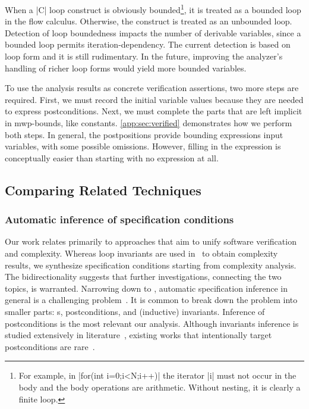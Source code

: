 When a \pr|C| loop construct is obviously bounded\footnote{For example, in \pr|for(int i=0;i<N;i++)| the iterator \pr|i| must not occur in the body and the body operations are arithmetic. Without nesting, it is clearly a finite loop.}, it is treated as a bounded loop in the flow calculus.
Otherwise, the construct is treated as an unbounded loop.
Detection of loop boundedness impacts the number of derivable variables, since a bounded loop permits iteration-dependency.
The current detection is based on loop form and it is still rudimentary.
In the future, improving the analyzer's handling of richer loop forms would yield more bounded variables.

To use the analysis results as concrete verification assertions, two more steps are required.
First, we must record the initial variable values because they are needed to express postconditions.
Next, we must complete the parts that are left implicit in mwp-bounds, like constants.
\autoref{app:sec:verified} demonstrates how we perform both steps.
In general, the postpositions provide bounding expressions \wrt input variables, with some possible omissions.
However, filling in the expression is conceptually easier than starting with no expression at all.

\subsection{Comparing Related Techniques}\label{sec:related-works}

\subsubsection{Automatic inference of specification conditions}
\label{subsec:automatic-inference}

Our work relates primarily to approaches that aim to unify software verification and complexity.
Whereas loop invariants are used in~\cite{nguyen2017} to obtain complexity results, we synthesize specification conditions starting from complexity analysis.
The bidirectionality suggests that further investigations, connecting the two topics, is warranted.
Narrowing down to , automatic specification inference in general is a challenging problem~\cite{dillig2013,yu2023}.
It is common to break down the problem into smaller parts: s, postconditions, and (inductive) invariants.
Inference of postconditions is the most relevant \wrt our analysis.
Although invariants inference is studied extensively in literature~\cite{karr1976,cousot1978,colon2003,sankaranarayanan2004,dillig2013,si2018,ryan2020,yao2020,yu2023,nguyen2014,nguyen2017},
existing works that intentionally target postconditions are rare~\cite{popeea2006,molina2021}.

